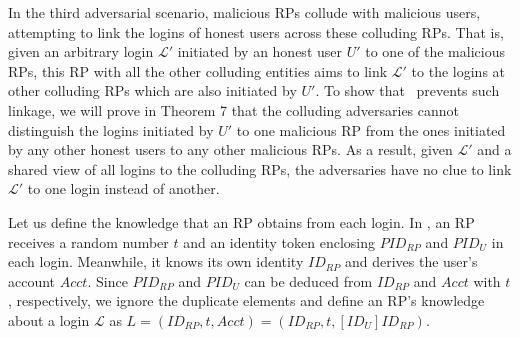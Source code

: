 


\vspace{2mm}

In the third adversarial scenario, malicious RPs collude with malicious users, attempting to link the logins of honest users across these colluding RPs. That is, given an arbitrary login $\mathcal{L'}$ initiated by an honest user $U'$ to one of the malicious RPs, this RP with all the other colluding entities aims to link $\mathcal{L'}$ to the logins at other colluding RPs which are also initiated by $U'$. To show that \usso~prevents such linkage, we will prove in Theorem 7 that the colluding adversaries cannot distinguish the logins initiated by $U'$ to one malicious RP from the ones initiated by any other honest users to any other malicious RPs. As a result, given $\mathcal{L'}$ and a shared view of all logins to the colluding RPs, the adversaries have no clue to link $\mathcal{L'}$ to one login instead of another.

Let us define the knowledge that an RP obtains from each login. In \usso, an RP receives a random number $t$ and an identity token enclosing $PID_{RP}$ and $PID_U$ in each login. Meanwhile, it knows its own identity $ID_{RP}$ and derives the user's account $Acct$. Since $PID_{RP}$ and $PID_U$ can be deduced from $ID_{RP}$ and $Acct$ with $t$, respectively, we ignore the duplicate elements and define an RP's knowledge about a login $\mathcal{L}$ as $L=(ID_{RP}, t, Acct)=(ID_{RP}, t, [ID_{U}]ID_{RP})$. %

